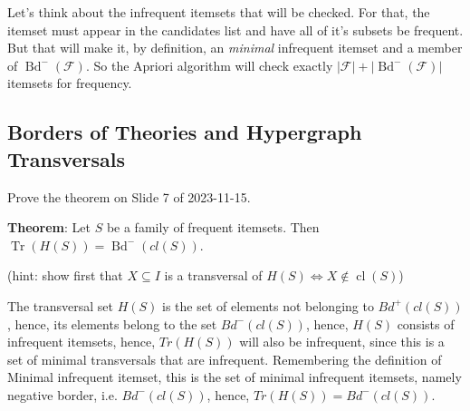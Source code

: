 \documentclass{article}
\begin{document}
  Let's think about the infrequent itemsets that will be checked.
  For that, the itemset must appear in the candidates list and have all of it's subsets be frequent.
  But that will make it, by definition, an \textit{minimal} infrequent itemset and a member of $\operatorname{Bd}^-(\mathcal{F})$.
  So the Apriori algorithm will check exactly $|\mathcal{F}| + |\operatorname{Bd}^-(\mathcal{F})|$ itemsets for frequency.

  \subsection{Borders of Theories and Hypergraph Transversals}
  \begin{centerframebox}
    Prove the theorem on Slide 7 of 2023-11-15.

    \textbf{Theorem}: Let $S$ be a family of frequent itemsets. Then $\operatorname{Tr}(H(S)) = \operatorname{Bd}^{-}(cl(S))$.

    (hint: show first that $X \subseteq I$ is a transversal of $H(S) \iff X \not\in \operatorname{cl}(S)$)
  \end{centerframebox}

  The transversal set $H(S)$ is the set of elements not belonging to $Bd^{+}(cl(S))$, hence, its elements belong to the set $Bd^{-}(cl(S))$, hence, $H(S)$ consists of infrequent itemsets, hence, $Tr(H(S))$ will also be infrequent, since this is a set of minimal transversals that are infrequent. Remembering the definition of Minimal infrequent itemset, this is the set of minimal infrequent itemsets, namely negative border, i.e. $Bd^{-}(cl(S))$, hence, $Tr(H(S)) = Bd^{-}(cl(S))$.
\end{document}

